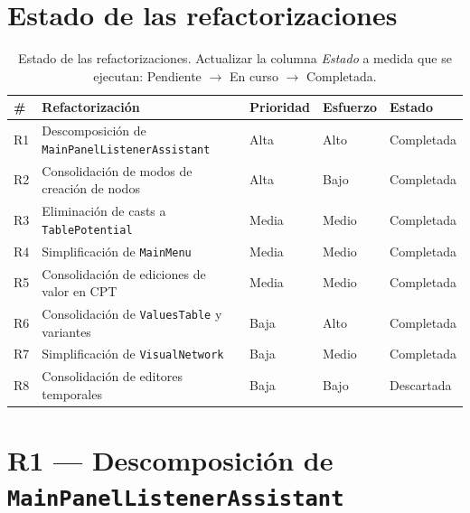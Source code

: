 \documentclass[12pt,a4paper]{article}
\newcommand{\clase}[1]{\texttt{#1}}
\begin{document}
\section{Estado de las refactorizaciones}
\label{sec:estado}

\begin{table}[H]
\centering
\small
\begin{tabular}{C{0.5cm}lC{1.8cm}C{1.5cm}C{1.5cm}}
\toprule
\textbf{\#} & \textbf{Refactorización} & \textbf{Prioridad} & \textbf{Esfuerzo} & \textbf{Estado} \\
\midrule
R1 & Descomposición de \clase{MainPanelListenerAssistant}  & Alta   & Alto     & Completada \\
R2 & Consolidación de modos de creación de nodos           & Alta   & Bajo     & Completada \\
R3 & Eliminación de casts a \clase{TablePotential}         & Media  & Medio    & Completada \\
R4 & Simplificación de \clase{MainMenu}                    & Media  & Medio    & Completada \\
R5 & Consolidación de ediciones de valor en CPT             & Media  & Medio    & Completada \\
R6 & Consolidación de \clase{ValuesTable} y variantes       & Baja   & Alto     & Completada \\
R7 & Simplificación de \clase{VisualNetwork}               & Baja   & Medio    & Completada \\
R8 & Consolidación de editores temporales                   & Baja   & Bajo     & Descartada \\
\bottomrule
\end{tabular}
\caption{Estado de las refactorizaciones. Actualizar la columna
         \emph{Estado} a medida que se ejecutan: Pendiente $\to$
         En curso $\to$ Completada.}
\label{tab:estado}
\end{table}

\section{R1 --- Descomposición de \clase{MainPanelListenerAssistant}}
\label{sec:r1}

\end{document}
